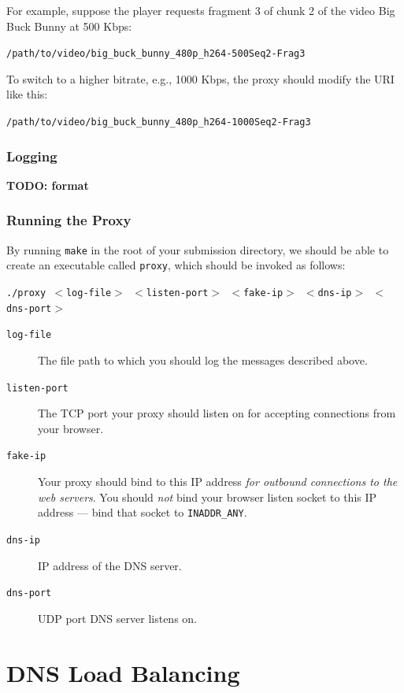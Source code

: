 \documentclass{article}
\begin{document}
For example, suppose the player requests fragment 3 of chunk 2 of the video Big
Buck Bunny at 500 Kbps:
\begin{center}
	\texttt{/path/to/video/big\_buck\_bunny\_480p\_h264-500Seq2-Frag3}
\end{center}
To switch to a higher bitrate, e.g., 1000 Kbps, the proxy should modify the URI
like this:
\begin{center}
	\texttt{/path/to/video/big\_buck\_bunny\_480p\_h264-1000Seq2-Frag3}
\end{center}


\subsubsection{Logging}

\textbf{TODO: format}


\subsubsection{Running the Proxy}

By running \texttt{make} in the root of your
submission directory, we should be able to create an executable called
\texttt{proxy}, which should be invoked as follows:
\begin{center}
	\texttt{./proxy $<$log-file$>$ $<$listen-port$>$ $<$fake-ip$>$ $<$dns-ip$>$ $<$dns-port$>$}
\end{center}

\begin{description}
	\item[\texttt{log-file}] The file path to which you should log the messages
	described above.
	\item[\texttt{listen-port}] The TCP port your proxy should listen on for
	accepting connections from your browser.
	\item[\texttt{fake-ip}] Your proxy should bind to this IP address \emph{for
	outbound connections to the web servers}. You should \emph{not} bind your
	browser listen socket to this IP address --- bind that socket to
	\texttt{INADDR\_ANY}.
	\item[\texttt{dns-ip}] IP address of the DNS server.
	\item[\texttt{dns-port}] UDP port DNS server listens on.
\end{description}





\section{DNS Load Balancing}
\label{sec:dns}
\end{document}
